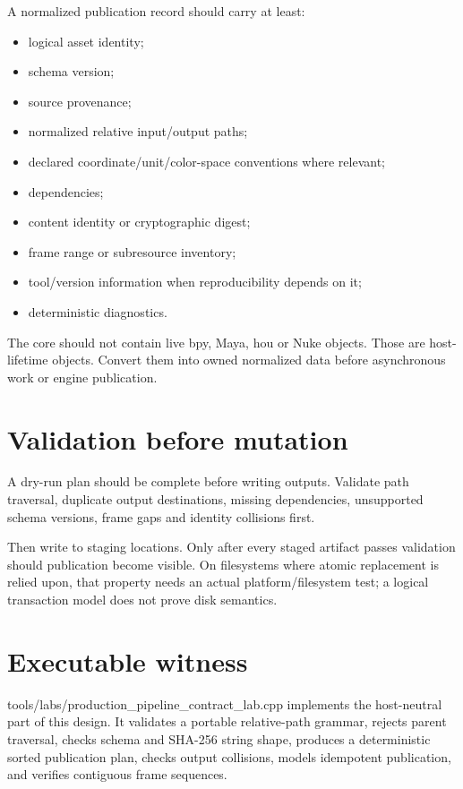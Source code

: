 A normalized publication record should carry at least:

\begin{itemize}
\tightlist
\item
  logical asset identity;
\item
  schema version;
\item
  source provenance;
\item
  normalized relative input/output paths;
\item
  declared coordinate/unit/color-space conventions where relevant;
\item
  dependencies;
\item
  content identity or cryptographic digest;
\item
  frame range or subresource inventory;
\item
  tool/version information when reproducibility depends on it;
\item
  deterministic diagnostics.
\end{itemize}

The core should not contain live bpy, Maya, hou or Nuke objects. Those are host-lifetime objects. Convert them into owned normalized data before asynchronous work or engine publication.

\section{Validation before mutation}\label{appendix-03ade9e1875f-validation-before-mutation}

A dry-run plan should be complete before writing outputs. Validate path traversal, duplicate output destinations, missing dependencies, unsupported schema versions, frame gaps and identity collisions first.

Then write to staging locations. Only after every staged artifact passes validation should publication become visible. On filesystems where atomic replacement is relied upon, that property needs an actual platform/filesystem test; a logical transaction model does not prove disk semantics.

\section{Executable witness}\label{appendix-03ade9e1875f-executable-witness}

tools/labs/production\_pipeline\_contract\_lab.cpp implements the host-neutral part of this design. It validates a portable relative-path grammar, rejects parent traversal, checks schema and SHA-256 string shape, produces a deterministic sorted publication plan, checks output collisions, models idempotent publication, and verifies contiguous frame sequences.

